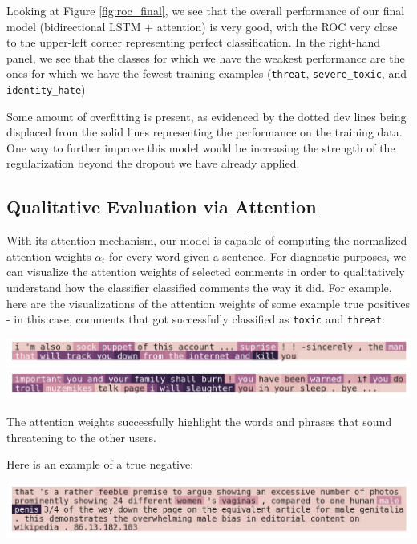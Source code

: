 \documentclass{article} %
\begin{document}
Looking at Figure \ref{fig:roc_final}, we see that the overall performance of our final model (bidirectional LSTM + attention) is very good, with the ROC very close to the upper-left corner representing perfect classification. In the right-hand panel, we see that the classes for which we have the weakest performance are the ones for which we have the fewest training examples (\texttt{threat}, \texttt{severe\_toxic}, and \texttt{identity\_hate})

Some amount of overfitting is present, as evidenced by the dotted dev lines being displaced from the solid lines representing the performance on the training data. One way to further improve this model would be increasing the strength of the regularization beyond the dropout we have already applied.

\subsection{Qualitative Evaluation via Attention}

With its attention mechanism, our model is capable of computing the normalized attention weights ${\alpha_t}$ for every word given a sentence. For diagnostic purposes, we can visualize the attention weights of selected comments in order to qualitatively understand how the classifier classified comments the way it did. For example, here are the visualizations of the attention weights of some example true positives - in this case, comments that got successfully classified as \texttt{toxic} and \texttt{threat}:

\includegraphics[width=\textwidth]{true_positive_toxic_threat_1.png}
\includegraphics[width=\textwidth]{true_positive_toxic_threat_2.png}

The attention weights successfully highlight the words and phrases that sound threatening to the other users. 
 
Here is an example of a true negative:

\includegraphics[width=\textwidth]{true_negative.png}
\end{document}
